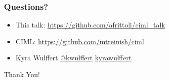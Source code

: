 \documentclass[aspectratio=169,11pt,hyperref={colorlinks=true}]{beamer}
\begin{document}

\begin{frame}
  \frametitle{Questions?}
  \begin{itemize}
    \item{This talk: \href{https://github.com/afrittoli/ciml\_talk}{https://github.com/afrittoli/ciml\_talk}}
    \item{CIML: \href{https://github.com/mtreinish/ciml}{https://github.com/mtreinish/ciml}}
  \end{itemize}
  \begin{itemize}
    \item Kyra Wulffert  \href{https://github.com/kwulffert/}{@kwulffert}  \href{https://www.linkedin.com/in/kyrawulffert/}{kyrawulffert}
  \end{itemize}

\end{frame}

\begin{centraldark}{Thank You!}\end{centraldark}
\end{document}
